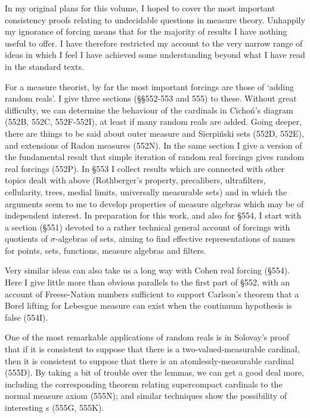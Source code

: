 
\def\chaptername{Possible worlds}


In my original plans for this volume, I hoped to cover the most important
consistency proofs relating to undecidable questions in measure theory.
Unhappily my ignorance of forcing means that for the majority of results I
have nothing useful to offer.   I have therefore restricted my account to
the very narrow range of ideas in which I feel I have achieved
some understanding beyond what I have read in the standard texts.

For a measure theorist, by far the most important forcings are those
of `adding random reals'.   I give three sections (\S\S552-553 and 555)
to these.
Without great difficulty, we can determine the behaviour of the cardinals
in Cicho\'n's diagram (552B, 552C, 552F-552I), %
at least if many random reals are
added.   Going deeper, there are things to be said about outer
measure and Sierpi\'nski sets (552D, 552E),
and extensions of Radon measures
(552N).   In the same section I give a version of the fundamental
result that simple iteration of random real forcings gives random
real forcings (552P).   In \S553 I collect results which are connected with
other topics dealt with above (Rothberger's property, precalibers,
ultrafilters, cellularity,
trees, medial limits, universally measurable sets) and in
which the arguments seem to me to develop properties of measure algebras
which may be of independent interest.
In preparation for this work, and also for \S554, I start with a section
(\S551) devoted to a rather technical
general account of forcings with quotients of
$\sigma$-algebras of sets, aiming to find effective representations of
names for points, sets, functions, measure algebras and filters.

Very similar ideas can also take us a long way with Cohen real forcing
(\S554).   Here I give little more than obvious parallels to the first part
of \S552, with an account of Freese-Nation numbers sufficient to support
Carlson's theorem that a Borel lifting for Lebesgue measure can exist when
the continuum hypothesis is false (554I).

One of the most remarkable applications of random reals is in Solovay's
proof that if it is consistent to suppose that there is a
two-valued-measurable cardinal, then it is consistent to suppose that there
is an atomlessly-measurable cardinal (555D).   By taking a bit of trouble
over the lemmas, we can get a good deal more, including the corresponding
theorem relating supercompact cardinals to the normal measure axiom (555N);
and similar techniques show the possibility of interesting \pssqa s
(555G, 555K).

